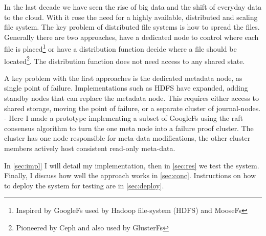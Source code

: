 In the last decade we have seen the rise of big data and the shift of everyday data to the cloud. With it rose the need for a highly available, distributed and scaling file system. The key problem of distributed file systems is how to spread the files. Generally there are two approaches, have a dedicated node to control where each file is placed\footnote{Inspired by GoogleFs\cite{gfs} used by Hadoop file-system\cite{hdfs} (HDFS) and MooseFs\cite{moosefs}} or have a distribution function decide where a file should be located\footnote{Pioneered by Ceph\cite{ceph} and also used by GlusterFs\cite{glusterfs}}. The distribution function does not need access to any shared state.

A key problem with the first approaches is the dedicated metadata node, as single point of failure. Implementations such as HDFS have expanded, adding standby nodes that can replace the metadata node. This requires either access to shared storage\cite{hdfs_ha_nfs}, moving the point of failure, or a separate cluster of journal-nodes\cite{hdfs_ha_q}.
-
Here I made a prototype implementing a subset of GoogleFs using the raft\cite{raft} consensus algorithm to turn the one meta node into a failure proof cluster. The cluster has one node responsible for meta-data modifications, the other cluster members actively host consistent read-only meta-data. 

In \cref{sec:impl} I will detail my implementation, then in \cref{sec:res} we test the system. Finally, I discuss how well the approach works in \cref{sec:conc}. Instructions on how to deploy the system for testing are in \cref{sec:deploy}.
